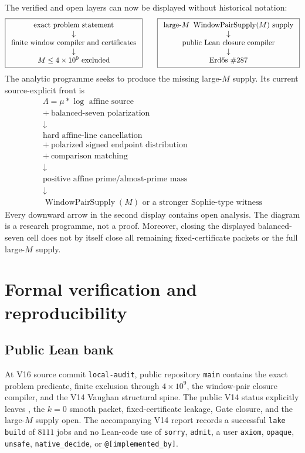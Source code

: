 \documentclass[11pt]{article}
\newcommand{\BuildCommit}{local-audit}%
\theoremstyle{definition}
\newcommand{\1}{\mathbf 1}
\newcommand{\WPS}{\operatorname{WindowPairSupply}}
\begin{document}
The verified and open layers can now be displayed without historical notation:
\[
\boxed{\begin{array}{c}
\text{exact problem statement}\\
\downarrow\\
\text{finite window compiler and certificates}\\
\downarrow\\
M\le4\times10^9\text{ excluded}
\end{array}}
\qquad
\boxed{\begin{array}{c}
\text{large-}M\ \WPS(M)\text{ supply}\\
\downarrow\\
\text{public Lean closure compiler}\\
\downarrow\\
\text{Erd\H{o}s \#287}
\end{array}}
\]
The analytic programme seeks to produce the missing large-$M$ supply.  Its current
source-explicit front is
\[
\boxed{\begin{array}{c}
\Lambda=\mu*\log\text{ affine source}\\
+\ \text{balanced-seven polarization}\\
\downarrow\\
\text{hard affine-line cancellation}\\
+\ \text{polarized signed endpoint distribution}\\
+\ \text{comparison matching}\\
\downarrow\\
\text{positive affine prime/almost-prime mass}\\
\downarrow\\
\WPS(M)\text{ or a stronger Sophie-type witness}
\end{array}}
\]
Every downward arrow in the second display contains open analysis.  The diagram is a
research programme, not a proof.  Moreover, closing the displayed balanced-seven cell does
not by itself close all remaining fixed-certificate packets or the full large-$M$ supply.

\section{Formal verification and reproducibility}

\subsection{Public Lean bank}
At V16 source commit \texttt{\BuildCommit}, public repository \texttt{main} contains the
exact problem predicate, finite exclusion through $4\times10^9$, the window-pair closure
compiler, and the V14 Vaughan structural spine.  The public V14 status explicitly leaves
, the $k=0$ smooth packet,
fixed-certificate leakage, Gate closure, and the large-$M$ supply open.  The accompanying
V14 report records a successful \texttt{lake build} of $8111$ jobs and no Lean-code use of
\texttt{sorry}, \texttt{admit}, a user \texttt{axiom}, \texttt{opaque},
\texttt{unsafe}, \texttt{native\_decide}, or \texttt{@[implemented\_by]}.
\end{document}
